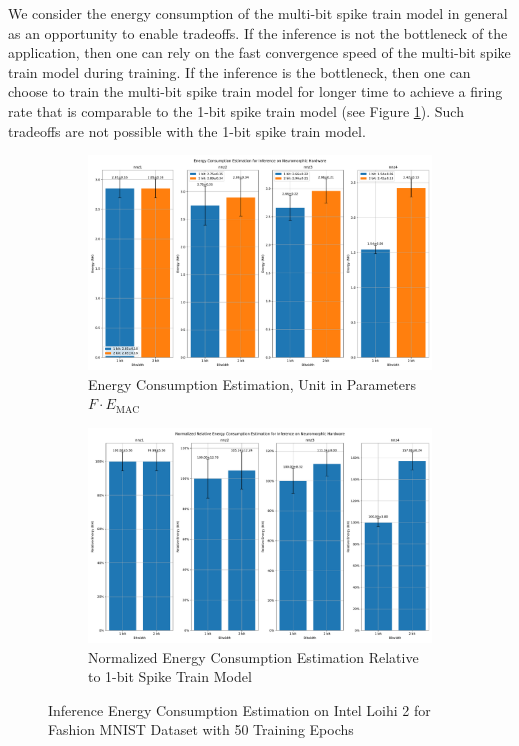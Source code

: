         We consider the energy consumption of the multi-bit spike train model in general as an opportunity to enable tradeoffs. If the inference is not the bottleneck of the application, then one can rely on the fast convergence speed of the multi-bit spike train model during training. If the inference is the bottleneck, then one can choose to train the multi-bit spike train model for longer time to achieve a firing rate that is comparable to the 1-bit spike train model (see Figure \ref{fig:inference_energy_nh_firerate}). Such tradeoffs are not possible with the 1-bit spike train model. 
        \begin{figure}[!htpb]
            \centering
            \begin{subfigure}[H]{0.48\textwidth}
                \includegraphics[width=\textwidth]{../firerate/FashionMNIST/plots/fashionmnist_test_energy_nh.pdf}
                \caption{Energy Consumption Estimation, Unit in Parameters $F\cdot E_{\text{MAC}}$}
            \end{subfigure}
            \hfill
            \begin{subfigure}[H]{0.48\textwidth}
                \includegraphics[width=\textwidth]{../firerate/FashionMNIST/plots/fashionmnist_test_relative_energy_nh.pdf}
                \caption{Normalized Energy Consumption Estimation Relative to 1-bit Spike Train Model}
            \end{subfigure}
            \caption{Inference Energy Consumption Estimation on Intel Loihi 2 for Fashion MNIST Dataset with 50 Training Epochs}
            \label{fig:inference_energy_nh_firerate}
        \end{figure}

